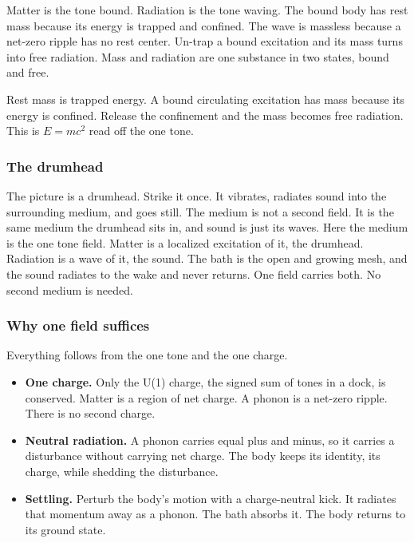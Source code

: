Matter is the tone bound. Radiation is the tone waving. The bound body has rest mass because its energy is
trapped and confined. The wave is massless because a net-zero ripple has no rest center. Un-trap a bound
excitation and its mass turns into free radiation. Mass and radiation are one substance in two states, bound and
free.

\begin{principle}
Rest mass is trapped energy. A bound circulating excitation has mass because its energy is confined. Release the
confinement and the mass becomes free radiation. This is $E = mc^2$ read off the one tone.
\end{principle}

\subsubsection{The drumhead}

The picture is a drumhead. Strike it once. It vibrates, radiates sound into the surrounding medium, and goes
still. The medium is not a second field. It is the same medium the drumhead sits in, and sound is just its waves.
Here the medium is the one tone field. Matter is a localized excitation of it, the drumhead. Radiation is a wave
of it, the sound. The bath is the open and growing mesh, and the sound radiates to the wake and never returns.
One field carries both. No second medium is needed.

\subsubsection{Why one field suffices}

Everything follows from the one tone and the one charge.

\begin{itemize}
\item \textbf{One charge.} Only the U(1) charge, the signed sum of tones in a dock, is conserved. Matter is a
region of net charge. A phonon is a net-zero ripple. There is no second charge.
\item \textbf{Neutral radiation.} A phonon carries equal plus and minus, so it carries a disturbance without
carrying net charge. The body keeps its identity, its charge, while shedding the disturbance.
\item \textbf{Settling.} Perturb the body's motion with a charge-neutral kick. It radiates that momentum away as
a phonon. The bath absorbs it. The body returns to its ground state.
\end{itemize}

